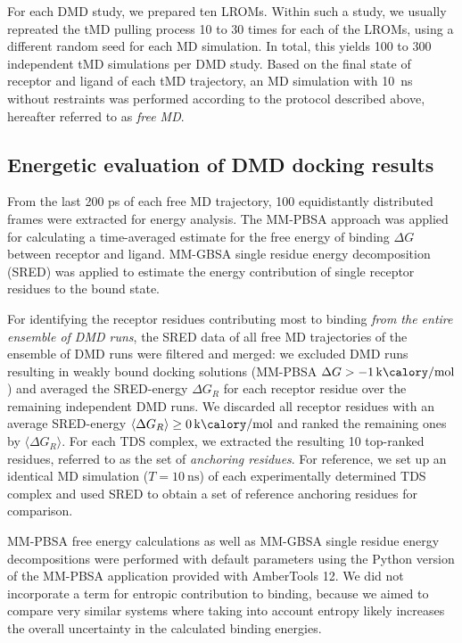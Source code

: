 For each DMD study, we prepared ten LROMs. Within such a study, we usually
repreated the tMD pulling process 10 to 30 times for each of the LROMs, using a
different random seed for each MD simulation. In total, this yields 100 to 300
independent tMD simulations per DMD study. Based on the final state of receptor
and ligand of each tMD trajectory, an MD simulation with \SI{10}{\nano\second}
without restraints was performed according to the protocol described above,
hereafter referred to as \textit{free MD}.


\subsection{Energetic evaluation of DMD docking results}


From the last 200 ps of each free MD trajectory, 100 equidistantly distributed
frames were extracted for energy analysis. The MM-PBSA \cite{mmpbsa_py} approach
was applied for calculating a time-averaged estimate for the free energy of
binding $\Delta G$ between receptor and ligand. MM-GBSA\cite{mmpbsa_py} single
residue energy decomposition (SRED) was applied to estimate the energy
contribution of single receptor residues to the bound state.

For identifying the receptor residues contributing most to binding \textit{from
the entire ensemble of DMD runs}, the SRED data of all free MD trajectories of
the ensemble of DMD runs were filtered and merged: we excluded DMD runs resulting in weakly bound docking solutions (MM-PBSA $\Delta G >
\SI{-1}{\kilo\calory\per\mole} $) and averaged the SRED-energy $\Delta G_R$ for
each receptor residue over the remaining independent DMD runs. We discarded all
receptor residues with an average SRED-energy $\langle\Delta G_R\rangle \ge
\SI{0}{\kilo\calory\per\mole}$ and ranked the remaining ones by $\langle\Delta
G_R\rangle$. For each TDS complex, we extracted the resulting 10 top-ranked
residues, referred to as the set of \textit{anchoring residues}. For reference,
we set up an identical MD simulation ($T=\SI{10}{\nano\second}$) of each
experimentally determined TDS complex and used SRED to obtain a set of reference
anchoring residues for comparison.

MM-PBSA free energy calculations as well as MM-GBSA single residue energy
decompositions were performed with default parameters using the Python version
of the MM-PBSA application provided with AmberTools 12. We did not incorporate a
term for entropic contribution to binding, because we aimed to compare very
similar systems where taking into account entropy likely increases the overall
uncertainty in the calculated binding energies{\cite{Gandhi01102009,
homeyer_gohlke_2012}}.


